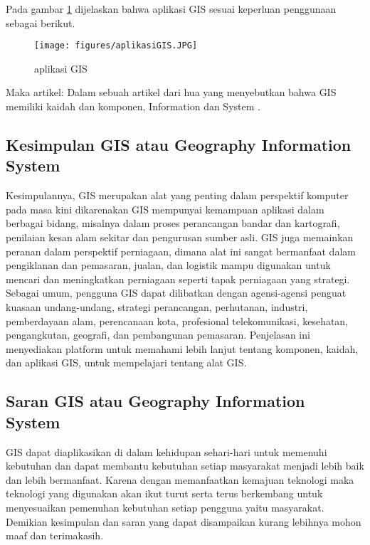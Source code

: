 Pada gambar \ref{aplikasi GIS} dijelaskan bahwa aplikasi GIS sesuai keperluan penggunaan sebagai berikut.

\begin{figure}[ht]
	\centerline{\texttt{[image: figures/aplikasiGIS.JPG]}}
	\caption{aplikasi GIS}
	\label{aplikasi GIS}
	\end{figure}

Maka artikel:
	Dalam sebuah artikel dari hua yang menyebutkan bahwa GIS memiliki kaidah dan komponen, Information dan System \cite{hua2017sistem}.


\subsection{Kesimpulan GIS atau Geography Information System}
Kesimpulannya, GIS merupakan alat yang penting dalam perspektif komputer pada masa kini dikarenakan GIS
mempunyai kemampuan aplikasi dalam berbagai bidang, misalnya dalam proses perancangan bandar dan kartografi,
penilaian kesan alam sekitar dan pengurusan sumber asli. GIS juga memainkan peranan dalam perspektif perniagaan,
dimana alat ini sangat bermanfaat dalam pengiklanan dan pemasaran, jualan, dan logistik 
mampu digunakan untuk mencari dan meningkatkan perniagaan seperti tapak perniagaan yang strategi. Sebagai umum, pengguna GIS dapat dilibatkan dengan agensi-agensi penguat kuasaan undang-undang, strategi
perancangan, perhutanan, industri, pemberdayaan alam, perencanaan kota, profesional
telekomunikasi, kesehatan, pengangkutan, geografi, dan pembangunan pemasaran. 
Penjelasan ini menyediakan platform untuk memahami lebih lanjut tentang komponen, kaidah, dan aplikasi GIS, 
untuk mempelajari tentang alat GIS.
\subsection{Saran GIS atau Geography Information System}

GIS dapat diaplikasikan di dalam kehidupan sehari-hari untuk memenuhi kebutuhan dan dapat membantu kebutuhan setiap masyarakat menjadi lebih baik dan lebih bermanfaat. Karena dengan memanfaatkan kemajuan teknologi maka teknologi yang digunakan akan ikut turut serta terus berkembang untuk menyesuaikan pemenuhan kebutuhan setiap pengguna yaitu masyarakat. Demikian kesimpulan dan saran yang dapat disampaikan kurang lebihnya mohon maaf dan terimakasih.

